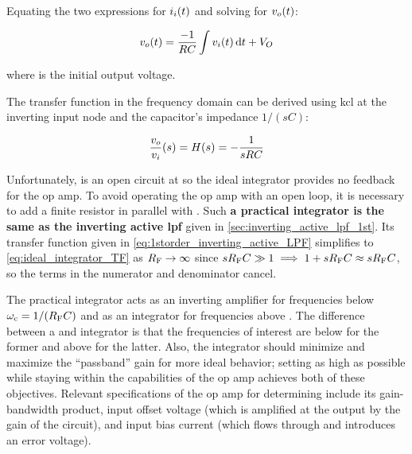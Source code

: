 Equating the two expressions for \(\iin(t)\) and solving for \(\vout(t)\):

\begin{equation}
	\vout(t) = \frac{-1}{RC}\int \vin(t) \odif{t} + \VOUT
	\label{eq:ideal_integrator_time}
\end{equation}

where \VOUT is the initial output voltage.

The transfer function in the frequency domain can be derived using \ac{kcl} at the inverting input node and the capacitor's impedance \(1/(sC)\):

\begin{equation}
	\frac{\vout}{\vin}(s) = \Hs = -\frac{1}{sRC}
	\label{eq:ideal_integrator_TF}
\end{equation}

Unfortunately, \C is an open circuit at \DC so the ideal integrator provides no \DC feedback for the op amp.
To avoid operating the op amp with an open loop, it is necessary to add a finite resistor \R[F] in parallel with \C.
Such \textbf{a practical integrator is the same as the inverting active \ac{lpf}} given in \autoref{sec:inverting_active_lpf_1st}.
Its transfer function given in \eqref{eq:1storder_inverting_active_LPF} simplifies to \eqref{eq:ideal_integrator_TF} as \(\R[F] \to \infty\) since \(s\R[F]C \gg 1 \implies 1 + s\R[F]C \approx s\R[F]C\), so the \R[F] terms in the numerator and denominator cancel.

The practical integrator acts as an inverting amplifier for frequencies below \(\wcutoff = 1/(\R[F]C)\) and as an integrator for frequencies above \wcutoff.
The difference between a  and integrator is that the frequencies of interest are below \wcutoff for the former and above \wcutoff for the latter. Also, the integrator should minimize \wcutoff and maximize the ``passband'' gain for more ideal behavior;
setting \R[F] as high as possible while staying within the capabilities of the op amp achieves both of these objectives.
Relevant specifications of the op amp for determining \R[F] include its gain-bandwidth product, input offset voltage (which is amplified at the output by the \DC gain of the circuit), and input bias current (which flows through \R[F] and introduces an error voltage).

